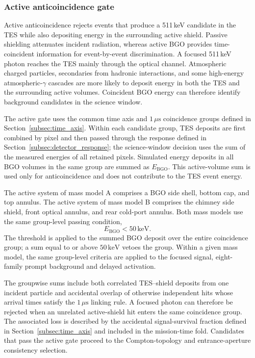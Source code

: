 \documentclass[11pt]{article}
\newcommand{\revblue}[1]{\textcolor{revisionblue}{#1}}
\newcommand{\keV}{\ensuremath{\,\mathrm{keV}}}
\begin{document}
\subsubsection{Active anticoincidence gate}

Active anticoincidence rejects events that produce a 511\,keV candidate in the
TES while also depositing energy in the surrounding active shield. Passive
shielding attenuates incident radiation, whereas active BGO provides
time-coincident information for event-by-event discrimination. A focused
511\,keV photon reaches the TES mainly through the optical channel. Atmospheric
charged particles, secondaries from hadronic interactions, and some
\revblue{high-energy atmospheric-$\gamma$ cascades} are more likely to deposit energy in both the TES
and the surrounding active volumes. Coincident BGO energy can therefore
identify background candidates in the science window.

The active gate uses the common time axis and $1\,\mu\mathrm{s}$ coincidence
groups defined in Section~\ref{subsec:time_axis}. Within each candidate group,
TES deposits are first combined by pixel and then passed through the response
defined in Section~\ref{subsec:detector_response}; the science-window decision
uses the sum of the measured energies of all retained pixels. Simulated energy
deposits in all BGO volumes in the same group are summed as
$E_{\mathrm{BGO}}$. This active-volume sum is used only for anticoincidence and
does not contribute to the TES event energy.

The active system of mass model A comprises a BGO side shell, bottom cap, and
top annulus. The active system of mass model B comprises the chimney side
shield, front optical annulus, and rear cold-port annulus. Both mass models use
the same group-level passing condition,
\[
 E_{\mathrm{BGO}}<50\keV .
\]
The threshold is applied to the summed BGO deposit over the entire coincidence
group; a sum equal to or above $50\keV$ vetoes the group.
Within a given mass model, the same group-level criteria are applied to the
focused signal, \revblue{eight-family prompt background and delayed
activation}.

The groupwise sums include both correlated TES--shield deposits from one
incident particle and accidental overlap of otherwise independent hits whose
arrival times satisfy the $1\,\mu\mathrm{s}$ linking rule. A focused photon can
therefore be rejected when an unrelated active-shield hit enters the same
coincidence group. The associated loss is described by the accidental
signal-survival fraction defined in Section~\ref{subsec:time_axis} and included
in the mission-time fold. Candidates that pass the active gate proceed to the
Compton-topology and entrance-aperture consistency selection.
\end{document}
